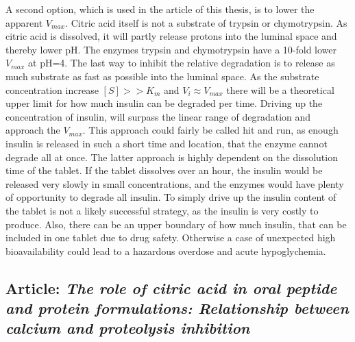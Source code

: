A second option, which is used in the article \cite{welling2014citric} of this thesis, is to lower the apparent $V_{max}$. Citric acid itself is not a substrate of trypsin or chymotrypsin. As citric acid is dissolved, it will partly release protons into the luminal space and thereby lower pH. The enzymes trypsin and chymotrypsin have a 10-fold lower $V_{max}$ at pH=4.
The last way to inhibit the relative degradation is to release as much substrate as fast as possible into the luminal space. As the substrate concentration increase $[S] >> K_m$ and $V_i \approx V_{max}$ there will be a theoretical upper limit for how much insulin can be degraded per time. Driving up the concentration of insulin, will surpass the linear range of degradation and approach the $V_{max}$. This approach could fairly be called hit and run, as enough insulin is released in such a short time and location, that the enzyme cannot degrade all at once. The latter approach is highly dependent on the dissolution time of the tablet. If the tablet dissolves over an hour, the insulin would be released very slowly in small concentrations, and the enzymes would have plenty of opportunity to degrade all insulin. To simply drive up the insulin content of the tablet is not a likely successful strategy, as the insulin is very costly to produce. Also, there can be an upper boundary of how much insulin, that can be included in one tablet due to drug safety. Otherwise a case of unexpected high bioavailability could lead to a hazardous overdose and acute hypoglychemia.

\subsection{Article: \textit{The role of citric acid in oral peptide and protein formulations: Relationship between calcium and proteolysis inhibition}}
\label{article:citric}
\newpage
